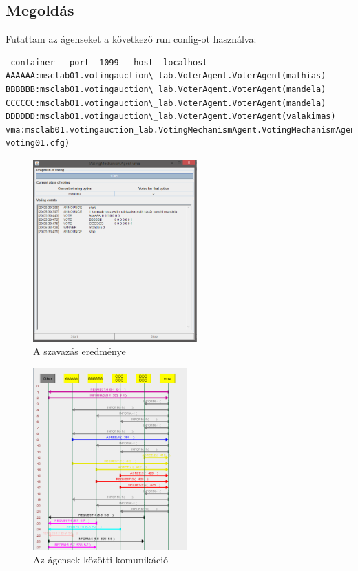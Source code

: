 \subsection{Megoldás}
Futattam az ágenseket a következő run config-ot használva:
\begin{lstlisting}[caption=Szavazás run config, frame=single,float=!ht]
-container  -port  1099  -host  localhost
AAAAAA:msclab01.votingauction\_lab.VoterAgent.VoterAgent(mathias)
BBBBBB:msclab01.votingauction\_lab.VoterAgent.VoterAgent(mandela)
CCCCCC:msclab01.votingauction\_lab.VoterAgent.VoterAgent(mandela)
DDDDDD:msclab01.votingauction\_lab.VoterAgent.VoterAgent(valakimas) 
vma:msclab01.votingauction_lab.VotingMechanismAgent.VotingMechanismAgent(cfg\backslash voting01.cfg)
\end{lstlisting}
\begin{figure}[!h]
\begin{center}
\includegraphics[height=7cm]{figures/ofel1a1.png}
\caption{A szavazás eredménye}
\end{center}
\end{figure}
\begin{figure}[!h]
\begin{center}
\includegraphics[height=7cm]{figures/ofel1a2.png}
\caption{Az ágensek közötti komunikáció}
\end{center}
\end{figure}
